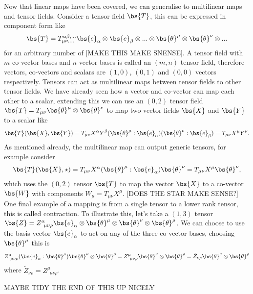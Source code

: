 Now that linear maps have been covered, we can generalise to multilinear maps and tensor fields. Consider a tensor field $\bs{T}$, this can be expressed in component form like 
\begin{equation}\bs{T} = T^{\alpha\beta, ...}_{\mu\nu,...} \bs{e}_\alpha\otimes\bs{e}_\beta \otimes... \otimes\bs{\theta}^\mu \otimes\bs{\theta}^\nu\otimes...
\end{equation}
for an arbitrary number of [MAKE THIS MAKE SNENSE]. A tensor field with $m$ co-vector bases and $n$ vector bases is called an $(m,n)$ tensor field, therefore vectors, co-vectors and scalars are $(1,0)$, $(0,1)$ and $(0,0)$ vectors respectively. Tensors can act as multilinear maps between tensor fields to other tensor fields. We have already seen how a vector and co-vector can map each other to a scalar, extending this we can use an $(0,2)$ tensor field $\bs{T}=T_{\mu\nu}\bs{\theta}^\mu\otimes\bs{\theta}^\nu$ to map two vector fields $\bs{X}$ and $\bs{Y}$ to a scalar like 
\begin{equation}
\bs{T}(\bs{X},\bs{Y}) = T_{\mu\nu}X^\alpha Y^\beta (\bs{\theta}^\mu:\bs{e}_\alpha)( \bs{\theta}^\nu:\bs{e}_\beta) = T_{\mu\nu}X^\mu Y^\nu.
\end{equation}
As mentioned already, the multilinear map can output generic tensors, for example consider 
\begin{equation}
\bs{T}(\bs{X},\star) = T_{\mu\nu} X^\alpha (\bs{\theta}^\mu:\bs{e}_\alpha)\bs{\theta}^\nu = T_{\mu\nu}X^\mu \bs{\theta}^\nu,
\end{equation}
which uses the $(0,2)$ tensor $\bs{T}$ to map the vector $\bs{X}$ to a co-vector $\bs{W}$ with components $W_\mu = T_{\mu\nu}X^\mu$. [DOES THE STAR MAKE SENSE?] One final example of a mapping is from a single tensor to a lower rank tensor, this is called contraction. To illustrate this, let's take a $(1,3)$ tensor $\bs{Z} = Z^\alpha_{\,\,\,\mu\nu\rho} \bs{e}_\alpha \otimes\bs{\theta}^\mu\otimes\bs{\theta}^\nu\otimes\bs{\theta}^\rho$. We can choose to use the basis vector $\bs{e}_\alpha$ to act on any of the three co-vector bases, choosing $\bs{\theta}^\mu$ this is
\begin{equation}
Z^\alpha_{\,\,\,\mu\nu\rho} (\bs{e}_\alpha : \bs{\theta}^\mu)\bs{\theta}^\nu\otimes\bs{\theta}^\rho = Z^\mu_{\,\,\,\mu\nu\rho}\bs{\theta}^\nu\otimes\bs{\theta}^\rho = \tilde{Z}_{\nu\rho}\bs{\theta}^\nu\otimes\bs{\theta}^\rho
\end{equation} 
where $\tilde{Z}_{\nu\rho} = Z^\mu_{\,\,\,\mu\nu\rho}$.

MAYBE TIDY THE END OF THIS UP NICELY

